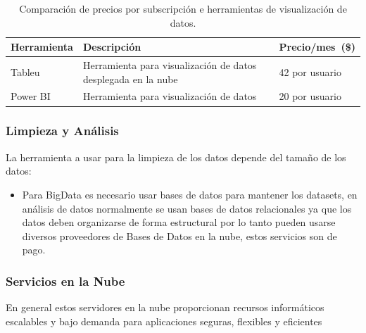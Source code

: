 \documentclass[12pt,a4paper,openright]{article}
\begin{document}
\begin{table}[ht]
\begin{tabular}{|p{4cm}|p{4cm}|p{4cm}|}
\hline
\textbf{Herramienta} & \textbf{Descripci\'on}                                                   & \textbf{Precio/mes\ (\$)} \\ \hline \hline
Tableu      & Herramienta para visualizaci\'on de datos desplegada en la nube & 42 por usuario  \\ \hline
Power BI    & Herramienta para visualizaci\'on de datos                       & 20 por usuario  \\ \hline
\end{tabular}
\caption{Comparaci\'on de precios por subscripci\'on e herramientas de visualizaci\'on de datos.}
\end{table}

\subsubsection{Limpieza y An\'alisis}
La herramienta a usar para la limpieza de los datos depende del tamaño de los datos:
\begin{itemize}
    \item Para BigData es necesario usar bases de datos para mantener los datasets, en análisis de datos normalmente se usan bases de datos relacionales ya que los datos deben organizarse de forma estructural por lo tanto pueden usarse diversos proveedores de Bases de Datos en la nube, estos servicios son de pago.
\end{itemize}

\subsubsection{Servicios en la Nube}
En general estos servidores en la nube proporcionan recursos informáticos escalables y bajo demanda para aplicaciones seguras, flexibles y eficientes
\end{document}
